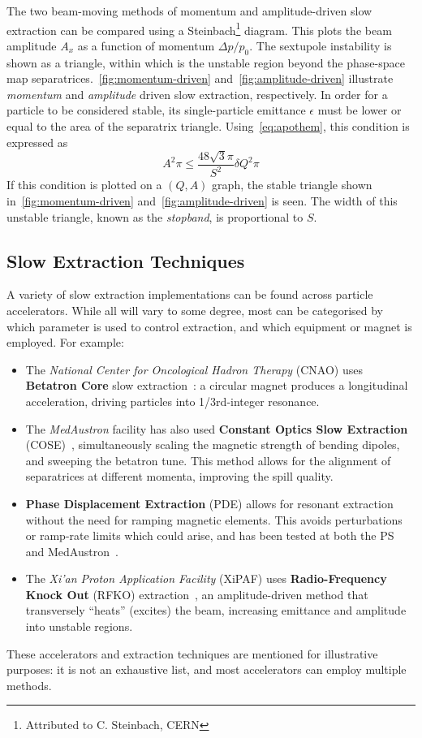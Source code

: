 \documentclass[a4paper,twoside,11pt]{report}
\begin{document}
The two beam-moving methods of momentum and amplitude-driven slow extraction can be compared using a Steinbach\footnote{Attributed to C. Steinbach, CERN} diagram. This plots the beam amplitude $A_x$ as a function of momentum $\Delta p/p_0$. The sextupole instability is shown as a triangle, within which is the unstable region beyond the phase-space map separatrices.~\autoref{fig:momentum-driven} and~\autoref{fig:amplitude-driven} illustrate \textit{momentum} and \textit{amplitude} driven slow extraction, respectively.
In order for a particle to be considered stable, its single-particle emittance $\epsilon$ must be lower or equal to the area of the separatrix triangle. Using~\autoref{eq:apothem}, this condition is expressed as
\begin{equation}
  A^2\pi\le\frac{48\sqrt 3\pi}{S^2}\delta Q^2\pi
  \label{eq:steinbach}
\end{equation} 
If this condition is plotted on a $(Q, A)$ graph, the stable triangle shown in~\autoref{fig:momentum-driven} and~\autoref{fig:amplitude-driven} is seen. The width of this unstable triangle, known as the \textit{stopband}, is proportional to $S$.

\subsection{Slow Extraction Techniques}\label{sec:rfko}

A variety of slow extraction implementations can be found across particle accelerators. While all will vary to some degree, most can be categorised by which parameter is used to control extraction, and which equipment or magnet is employed. For example:
\begin{itemize}
  \item The \textit{National Center for Oncological Hadron Therapy} (CNAO) uses \textbf{Betatron Core} slow extraction~\cite{Falbo:IPAC2018-TUZGBF3}: a circular magnet produces a longitudinal acceleration, driving particles into 1/3rd-integer resonance.
  \item The \textit{MedAustron} facility has also used \textbf{Constant Optics Slow Extraction} (COSE)~\cite{ArrutiaSota:2845862}, simultaneously scaling the magnetic strength of bending dipoles, and sweeping the betatron tune. This method allows for the alignment of separatrices at different momenta, improving the spill quality.
  \item \textbf{Phase Displacement Extraction} (PDE) allows for resonant extraction without the need for ramping magnetic elements. This avoids perturbations or ramp-rate limits which could arise, and has been tested at both the PS and MedAustron~\cite{ARRUTIASOTA2022167007}.
  \item The \textit{Xi’an Proton Application Facility} (XiPAF) uses \textbf{Radio-Frequency Knock Out} (RFKO) extraction~\cite{Yao:2016cnf}, an amplitude-driven method that transversely ``heats'' (excites) the beam, increasing emittance and amplitude into unstable regions.
\end{itemize}
These accelerators and extraction techniques are mentioned for illustrative purposes: it is not an exhaustive list, and most accelerators can employ multiple methods.
 
\end{document}
